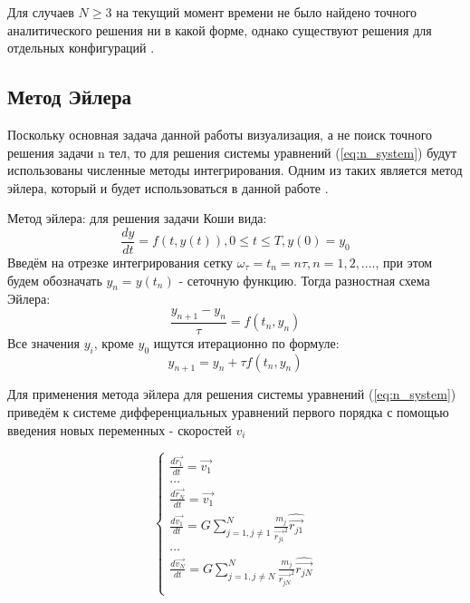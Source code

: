 Для случаев $N \geq 3$ на текущий момент времени не было найдено точного аналитического решения ни в какой форме, однако существуют решения для отдельных конфигураций \cite{solution3}.

\subsection{Метод Эйлера}
Поскольку основная задача данной работы визуализация, а не поиск точного решения задачи n тел, то для решения системы уравнений (\ref{eq:n_system}) будут использованы численные методы интегрирования. Одним из таких является метод эйлера, который и будет использоваться в данной работе \cite{nbody-numeric}\cite{samarskii}.

Метод эйлера: для решения задачи Коши вида:
\begin{equation}
	\label{eq:koshi}
	\frac{dy}{dt} = f(t, y(t)), 0 \leq t \leq T, y(0) = y_0
\end{equation}
Введём на отрезке интегрирования сетку $\omega_\tau = {t_n = n\tau, n = 1,2,....}$, при этом будем обозначать $y_n = y(t_n)$  - сеточную функцию.
Тогда разностная схема Эйлера:
\begin{equation}
	\label{eq:euler_frac}
	\frac{y_{n+1} - y_n}{\tau} = f(t_n, y_n)
\end{equation}
Все значения $y_i$, кроме $y_0$ ищутся итерационно по формуле:
\begin{equation}
	\label{eq:euler_formula}
	y_{n+1} = y_n + \tau f(t_n, y_n)
\end{equation}

Для применения метода эйлера для решения системы уравнений (\ref{eq:n_system}) приведём к системе дифференциальных уравнений первого порядка с помощью введения новых переменных - скоростей $v_i$ 

\begin{equation}
	\label{n_system_velocities}
	\begin{cases}
		\frac{d\vec{r_1}}{dt} = \vec{v_1} \\
		\dots \\
		\frac{d\vec{r_N}}{dt} = \vec{v_1} \\
		
		\frac{d\vec{v_1}}{dt} = G\sum_{j=1, j \neq 1}^{N}{\frac{m_j}{\vec{r_{j1}}^2}\hat{\vec{r_{j1}}}} \\
		\dots \\
		\frac{d\vec{v_N}}{dt} = G\sum_{j=1, j \neq N}^{N}{\frac{m_j}{\vec{r_{jN}}^2}\hat{\vec{r_{jN}}}} \\
	\end{cases}
\end{equation}

